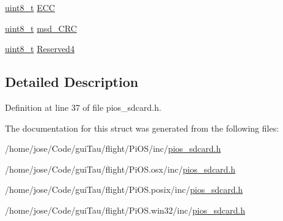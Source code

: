 \begin{DoxyCompactItemize}
\item 
\hyperlink{stdint_8h_aba7bc1797add20fe3efdf37ced1182c5}{uint8\-\_\-t} \hyperlink{group___p_i_o_s___s_d_c_a_r_d_ga5e147c22c2995b291b7a5ea1a600c5a0}{E\-C\-C}
\item 
\hyperlink{stdint_8h_aba7bc1797add20fe3efdf37ced1182c5}{uint8\-\_\-t} \hyperlink{group___p_i_o_s___s_d_c_a_r_d_ga653812c0595db0ef3eddae3dbf409b87}{msd\-\_\-\-C\-R\-C}
\item 
\hyperlink{stdint_8h_aba7bc1797add20fe3efdf37ced1182c5}{uint8\-\_\-t} \hyperlink{group___p_i_o_s___s_d_c_a_r_d_ga2154190e5c6f32ce3b67bdc4a9aa3982}{Reserved4}
\end{DoxyCompactItemize}


\subsection{Detailed Description}


Definition at line 37 of file pios\-\_\-sdcard.\-h.



The documentation for this struct was generated from the following files\-:\begin{DoxyCompactItemize}
\item 
/home/jose/\-Code/gui\-Tau/flight/\-Pi\-O\-S/inc/\hyperlink{inc_2pios__sdcard_8h}{pios\-\_\-sdcard.\-h}\item 
/home/jose/\-Code/gui\-Tau/flight/\-Pi\-O\-S.\-osx/inc/\hyperlink{osx_2inc_2pios__sdcard_8h}{pios\-\_\-sdcard.\-h}\item 
/home/jose/\-Code/gui\-Tau/flight/\-Pi\-O\-S.\-posix/inc/\hyperlink{posix_2inc_2pios__sdcard_8h}{pios\-\_\-sdcard.\-h}\item 
/home/jose/\-Code/gui\-Tau/flight/\-Pi\-O\-S.\-win32/inc/\hyperlink{win32_2inc_2pios__sdcard_8h}{pios\-\_\-sdcard.\-h}\end{DoxyCompactItemize}
